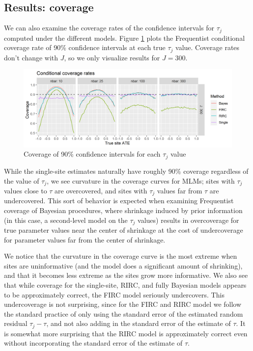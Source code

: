 \documentclass[]{article}
\begin{document}
\subsection{Results: coverage}

We can also examine the coverage rates of the confidence intervals for $\tau_j$ computed under the different models.
Figure \ref{fig:coverage_plot} plots the Frequentist conditional coverage rate of 90\% confidence intervals at each true $\tau_j$ value.
Coverage rates don't change with $J$, so we only visualize results for $J = 300$.

\begin{figure}[ht]
	\centering
	\includegraphics[width=\textwidth]{coverage_plot}
	\caption{Coverage of 90\% confidence intervals for each $\tau_j$ value}
	\label{fig:coverage_plot}
\end{figure}

While the single-site estimates naturally have roughly 90\% coverage regardless of the value of $\tau_j$, we see curvature in the coverage curves for MLMs; sites with $\tau_j$ values close to $\tau$ are overcovered, and sites with $\tau_j$ values far from $\tau$ are undercovered.
This sort of behavior is expected when examining Frequentist coverage of Bayesian procedures, where shrinkage induced by prior information (in this case, a second-level model on the $\tau_j$ values) results in overcoverage for true parameter values near the center of shrinkage at the cost of undercoverage for parameter values far from the center of shrinkage.

We notice that the curvature in the coverage curve is the most extreme when sites are uninformative (and the model does a significant amount of shrinking), and that it becomes less extreme as the sites grow more informative.
We also see that while coverage for the single-site, RIRC, and fully Bayesian models appears to be approximately correct, the FIRC model seriously undercovers.
This undercoverage is not surprising, since for the FIRC and RIRC model we follow the standard practice of only using the standard error of the estimated random residual $\tau_j - \tau$, and not also adding in the standard error of the estimate of $\tau$.
It is somewhat more surprising that the RIRC model is approximately correct even without incorporating the standard error of the estimate of $\tau$.
\end{document}
